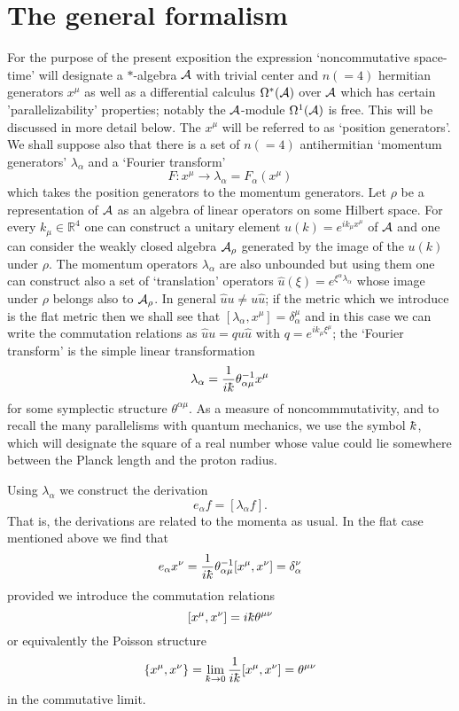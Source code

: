 \documentclass[12pt,a4paper]{article}
\newcounter{eg}
\def\b#1{{\mathbb #1}}
\def\c#1{{\cal #1}}
\def\kbar{{\mathchar'26\mkern-9muk}}
\newcommand{\initiate}{\setcounter{equation}{0}}
\begin{document}
\initiate
\section{The general formalism}

For the purpose of the present exposition the expression
`noncommutative space-time' will designate a $*$-algebra $\c{A}$ with
trivial center and $n(=4)$ hermitian generators $x^\mu$ as well as a
differential calculus $\Omega^*(\c{A})$ over $\c{A}$ which has certain
'parallelizability' properties; notably the $\c{A}$-module
$\Omega^1(\c{A})$ is free. This will be discussed in more detail
below. The $x^\mu$ will be referred to as `position generators'.  We
shall suppose also that there is a set of $n(=4)$ antihermitian
`momentum generators' $\lambda_\alpha$ and a `Fourier transform'
$$
F: x^\mu \longrightarrow \lambda_\alpha = F_\alpha (x^\mu)
$$
which takes the position generators to the momentum generators.
Let $\rho$ be a representation of $\c{A}$ as an algebra of linear
operators on some Hilbert space.  For every $k_\mu \in \b{R}^4$ one
can construct a unitary element $u(k) = e^{ik_\mu x^\mu}$ of $\c{A}$ 
and one can consider the weakly closed algebra $\c{A}_\rho$ generated
by the image of the $u(k)$ under $\rho$.  The momentum operators
$\lambda_\alpha$ are also unbounded but using them one can construct
also a set of `translation' operators 
$\hat u(\xi) = e^{\xi^\alpha \lambda_\alpha}$ whose image under $\rho$
belongs also to $\c{A}_\rho$. In general $\hat u u \neq u \hat u$; if
the metric which we introduce is the flat metric then we shall see
that $[\lambda_\alpha, x^\mu] = \delta^\mu_\alpha$ and in this case we
can write the commutation relations as $\hat u u = q u \hat u$ with 
$q = e^{i k_\mu \xi^\mu}$;  the `Fourier transform' is the simple linear
transformation
\begin{equation}
\lambda_\alpha  = \frac{1}{i\kbar}\theta^{-1}_{\alpha\mu} x^\mu   \label{bc}
\end{equation}
for some symplectic structure $\theta^{\alpha\mu}$. As a measure of
noncommmutativity, and to recall the many parallelisms with quantum
mechanics, we use the symbol $\kbar$, which will designate the square
of a real number whose value could lie somewhere between the Planck
length and the proton radius. 

Using $\lambda_\alpha$ we construct the derivation
$$
e_\alpha f = [\lambda_\alpha f].
$$
That is, the derivations are related to the momenta as
usual.  In the flat case mentioned above we find that
$$
e_\alpha x^\nu = 
\frac{1}{i\kbar}\theta^{-1}_{\alpha\mu} [x^\mu, x^\nu] = \delta_\alpha^\nu
$$
provided we introduce the commutation relations
$$
[x^\mu, x^\nu] = i\kbar \theta^{\mu\nu}
$$
or equivalently the Poisson structure 
$$
\{x^\mu, x^\nu\} = 
\lim_{\kbar\to 0}\frac 1{i\kbar} [x^\mu, x^\nu] = \theta^{\mu\nu}
$$
in the commutative limit.  
\end{document}
